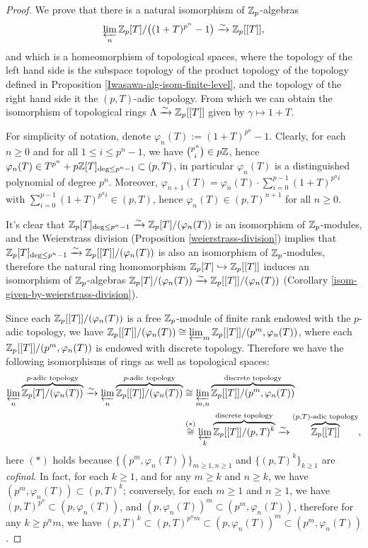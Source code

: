 \begin{proof}
We prove that there is a natural isomorphism of ${\mathbb {Z}}_p$-algebras
$$
\varprojlim_n{\mathbb {Z}}_p[T]/\big((1+T)^{p^n}-1\big)
\xrightarrow\sim{\mathbb {Z}}_p[[T]],
$$
and which is a homeomorphism of topological spaces,
where the topology of the left hand side is the subspace topology
of the product topology of the topology defined in Proposition
\ref{Iwasawa-alg-isom-finite-level},
and the topology of the right hand side it the $(p,T)$-adic topology.
From which we can obtain the isomorphism of topological rings
$\Lambda\xrightarrow\sim{\mathbb {Z}}_p[[T]]$ given by $\gamma\mapsto 1+T$.

For simplicity of notation, denote $\varphi_n(T):=(1+T)^{p^n}-1$.
Clearly, for each $n\geq 0$ and for all $1\leq i\leq p^n-1$,
we have $\binom{p^n}{i}\in p{\mathbb {Z}}$,
hence $\varphi_n(T)\in T^{p^n}+p{\mathbb {Z}}[T]_{\deg\leq p^n-1}\subset(p,T)$,
in particular $\varphi_n(T)$ is a distinguished polynomial of degree $p^n$.
Moreover, $\varphi_{n+1}(T)=\varphi_n(T)\cdot\sum_{i=0}^{p-1}(1+T)^{p^ni}$
with $\sum_{i=0}^{p-1}(1+T)^{p^ni}\in(p,T)$,
hence $\varphi_n(T)\in(p,T)^{n+1}$ for all $n\geq 0$.

It's clear that ${\mathbb {Z}}_p[T]_{\deg\leq p^n-1}\xrightarrow\sim{\mathbb {Z}}_p[T]/(\varphi_n(T))$
is an isomorphism of ${\mathbb {Z}}_p$-modules,
and the Weierstrass division (Proposition \ref{weierstrass-division}) implies that
${\mathbb {Z}}_p[T]_{\deg\leq p^n-1}\xrightarrow\sim{\mathbb {Z}}_p[[T]]/(\varphi_n(T))$
is also an isomorphism of ${\mathbb {Z}}_p$-modules,
therefore the natural ring homomorphism ${\mathbb {Z}}_p[T]\hookrightarrow{\mathbb {Z}}_p[[T]]$
induces an isomorphism of ${\mathbb {Z}}_p$-algebras
${\mathbb {Z}}_p[T]/(\varphi_n(T))\xrightarrow\sim{\mathbb {Z}}_p[[T]]/(\varphi_n(T))$
(Corollary \ref{isom-given-by-weierstrass-division}).

Since each ${\mathbb {Z}}_p[[T]]/(\varphi_n(T))$ is a free ${\mathbb {Z}}_p$-module of finite rank
endowed with the $p$-adic topology, we have
${\mathbb {Z}}_p[[T]]/(\varphi_n(T))\cong\varprojlim_m{\mathbb {Z}}_p[[T]]/(p^m,\varphi_n(T))$,
where each ${\mathbb {Z}}_p[[T]]/(p^m,\varphi_n(T))$ is endowed with discrete topology.
Therefore we have the following isomorphisms of rings as well as topological spaces:
\begin{align*}
\varprojlim_n\overbrace{{\mathbb {Z}}_p[T]/(\varphi_n(T))}^{p\text{-adic topology}}
\xrightarrow\sim
\varprojlim_n\overbrace{{\mathbb {Z}}_p[[T]]/(\varphi_n(T))}^{p\text{-adic topology}}
&\cong
\varprojlim_{m,n}\overbrace{{\mathbb {Z}}_p[[T]]/(p^m,\varphi_n(T))}^{\text{discrete topology}} \\
&\stackrel{(*)}\cong
\varprojlim_k\overbrace{{\mathbb {Z}}_p[[T]]/(p,T)^k}^{\text{discrete topology}}
\xrightarrow\sim
\overbrace{{\mathbb {Z}}_p[[T]]}^{(p,T)\text{-adic topology}},
\end{align*}
here $(*)$ holds because $\{(p^m,\varphi_n(T))\}_{m\geq 1,n\geq 1}$
and $\{(p,T)^k\}_{k\geq 1}$ are \emph{cofinal}.
In fact, for each $k\geq 1$, and for any $m\geq k$ and $n\geq k$,
we have $(p^m,\varphi_n(T))\subset(p,T)^k$;
conversely, for each $m\geq 1$ and $n\geq 1$,
we have $(p,T)^{p^n}\subset(p,\varphi_n(T))$,
and $(p,\varphi_n(T))^m\subset(p^m,\varphi_n(T))$,
therefore for any $k\geq p^nm$, we have
$(p,T)^k\subset(p,T)^{p^nm}\subset(p,\varphi_n(T))^m\subset(p^m,\varphi_n(T))$.
\end{proof}

